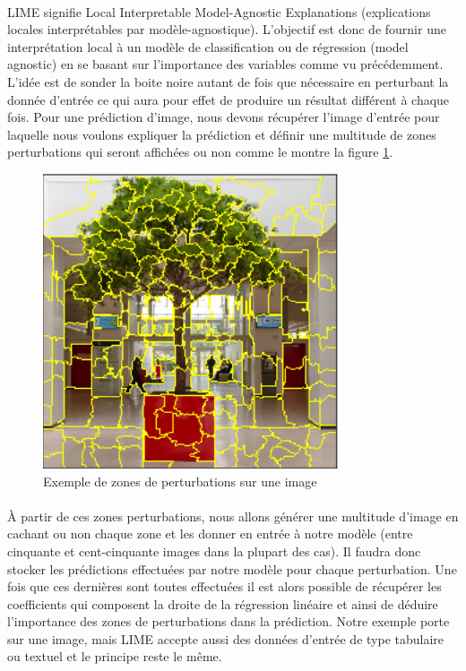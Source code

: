 \paragraph{}LIME signifie Local Interpretable Model-Agnostic Explanations (explications locales interprétables par modèle-agnostique). L'objectif est donc de fournir une interprétation local à un modèle de classification ou de régression (model agnostic) en se basant sur l’importance des variables comme vu précédemment. L'idée est de sonder la boite noire autant de fois que nécessaire en perturbant la donnée d'entrée ce qui aura pour effet de produire un résultat différent à chaque fois. Pour une prédiction d'image, nous devons récupérer l'image d'entrée pour laquelle nous voulons expliquer la prédiction et définir une multitude de zones perturbations qui seront affichées ou non comme le montre la figure \ref{perturbationExemple}.
\begin{figure}[h]
\centering
\includegraphics[scale=0.6]{src_img/perturbationExemple.png}
\caption{Exemple de zones de perturbations sur une image}
\label{perturbationExemple}
\end{figure}
\paragraph{}À partir de ces zones perturbations, nous allons générer une multitude d'image en cachant ou non chaque zone et les donner en entrée à notre modèle (entre cinquante et cent-cinquante images dans la plupart des cas). Il faudra donc stocker les prédictions effectuées par notre modèle pour chaque perturbation. Une fois que ces dernières sont toutes effectuées il est alors possible de récupérer les coefficients qui composent la droite de la régression linéaire et ainsi de déduire l'importance des zones de perturbations dans la prédiction. Notre exemple porte sur une image, mais LIME accepte aussi des données d'entrée de type tabulaire ou textuel et le principe reste le même.

